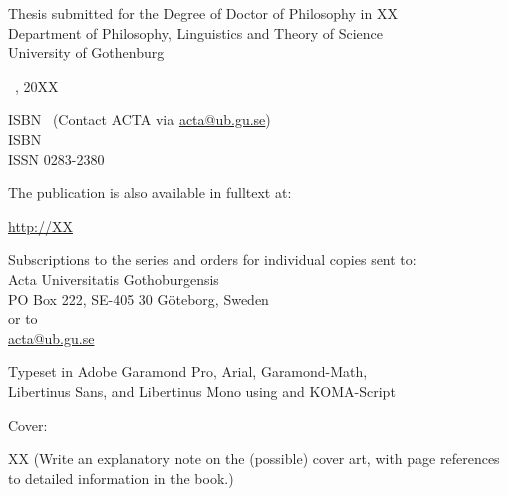 \newpage
\restoregeometry
\frontmatterchapters

\fontsize{13}{18}\selectfont

\vspace*{\fill}

\begin{flushleft}
Thesis submitted for the Degree of Doctor of Philosophy in XX\\
Department of Philosophy, Linguistics and Theory of Science\\
University of Gothenburg
\end{flushleft}


\begin{flushleft}
\textcopyright\ 
\makeatletter{\MakeUppercase{\@author}}\makeatother, 20XX
\end{flushleft}

\begin{flushleft}
\makeatletter ISBN \makeatother\ (Contact ACTA via \url{acta@ub.gu.se})\\
\makeatletter ISBN \@isbnd { (pdf)}\makeatother\\
ISSN 0283-2380
\end{flushleft}

\begin{flushleft}
The publication is also available in fulltext at:

\url{http://XX}
\end{flushleft}

\begin{flushleft}
Subscriptions to the series and orders for individual copies sent to:\\
Acta Universitatis Gothoburgensis\\
PO Box 222, SE-405 30 G\"oteborg, Sweden \\
or to\\
\url{acta@ub.gu.se}
\end{flushleft}

\begin{flushleft}
Typeset in Adobe Garamond Pro, Arial, Garamond-Math,\\
Libertinus Sans, and Libertinus Mono using {\latexfont \XeLaTeX} and KOMA-Script
\end{flushleft}

\begin{flushleft}
Cover: 

XX (Write an explanatory note on the (possible) cover art, with page references to detailed information in the book.)
\end{flushleft}

